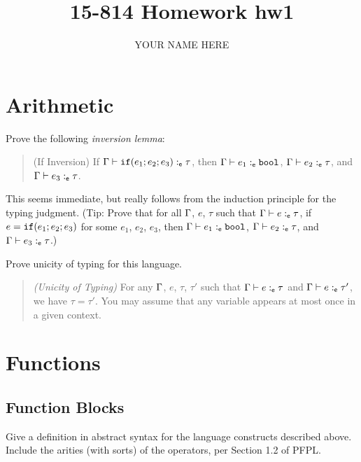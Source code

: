 \documentclass{article}
\title{15-814 Homework hw1}
\author{YOUR NAME HERE}
\begin{document}
\maketitle

\section{Arithmetic}
\begin{task}
Prove the following \emph{inversion lemma}:
\begin{quote}
  (If Inversion) If $\Gamma \vdash \mathtt{if}(e_1; e_2; e_3) :_{\mathsf{e}} \tau$,
  then $\Gamma \vdash e_1 :_{\mathsf{e}} \mathtt{bool}$, $\Gamma \vdash
  e_2 :_{\mathsf{e}} \tau$, and $\Gamma \vdash e_3 :_{\mathsf{e}} \tau$.
\end{quote}
This seems immediate, but really follows from the induction principle
for the typing judgment. (Tip: Prove that for all $\Gamma$, $e$, $\tau$
such that $\Gamma \vdash e :_{\mathsf{e}} \tau$, if $e = \mathtt{if}(e_1; e_2; e_3)$
for some $e_1$, $e_2$, $e_3$, then $\Gamma \vdash e_1 :_{\mathsf{e}} \mathtt{bool}$,
$\Gamma \vdash e_2 :_{\mathsf{e}} \tau$, and $\Gamma \vdash e_3 :_{\mathsf{e}} \tau$.)
\end{task}
\begin{sol}
\end{sol}

\begin{task}
Prove unicity of typing for this language.
\begin{quote}
  \emph{(Unicity of Typing)} For any $\Gamma$, $e$, $\tau$, $\tau'$ such
  that $\Gamma \vdash e :_{\mathsf{e}} \tau$ and $\Gamma \vdash
  e :_{\mathsf{e}} \tau'$, we have $\tau = \tau'$. You may assume that any
  variable appears at most once in a given context.
\end{quote}
\end{task}
\begin{sol}
\end{sol}

\section{Functions}
\subsection{Function Blocks} \label{sec:function-blocks}
\begin{task} \label{task:syntax}
  Give a definition in abstract syntax for the language constructs
  described above. Include the arities (with sorts) of the operators,
  per Section 1.2 of PFPL.
\end{task}
\begin{sol}
\end{sol}
\end{document}
